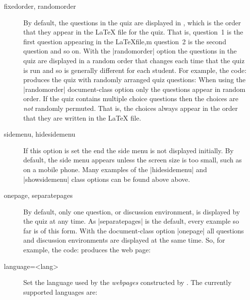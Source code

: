 \documentclass[svgnames]{article}
\begin{document}
  \begin{description}
    \item[fixedorder, randomorder]
      By default, the questions in the quiz are displayed in
      , which is the order that they appear in
      the \LaTeX{} file for the quiz. That is, question~1 is the first
      question appearing in the \LaTeX file,m question~2 is the second
      question and so on. With the \LatexCode|randomorder| option the
      questions in the quiz are displayed in a random order that
      changes each time that the quiz is run and so is generally different for
      each student. For example, the code:
      produces the quiz with randomly arranged quiz questions:
      When using the \LatexCode|randomorder| document-class option only
      the questions appear in random order. If the quiz contains multiple
      choice questions then the choices are \textit{not} randomly
      permuted. That is, the choices always appear in the order that they
      are written in the \LaTeX{} file.

    \item[sidemenu, hidesidemenu]
      If this option is set the end the side menu is not displayed
      initially. By default, the side menu appears unless the screen size
      is too small, such as on a mobile phone. Many examples of the
      \LatexCode|hidesidemenu| and \LatexCode|showsidemenu| class options
      can be found above above.

    \item[onepage, separatepages]
    By default, only one question, or discussion environment, is displayed
    by the quiz at any time. As \LatexCode|separatepages| is the default, every
    example so far is of this form. With the document-class option
    \LatexCode|onepage| all questions and discussion environments are
    displayed at the same time. So, for example, the code:
    produces the web page:

    \item[language=<lang>] 
    Set the language used by the \textit{webpages} constructed by \WebQuiz.
    The currently supported languages are:


\end{description}
\end{document}
